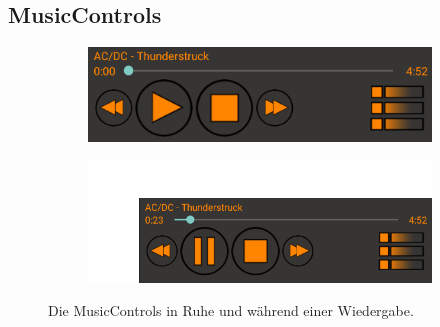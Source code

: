 \documentclass[FIPLY_base.tex]{subfiles}
\begin{document}
\newpage
\subsection {MusicControls}

\begin{figure}[h]
	\begin{subfigure}[b]{0.3\textwidth}
	\includegraphics[scale=0.55]{img/musicControls}
	\end{subfigure}
	\hfil
	\begin{subfigure}[b]{0.3\textwidth}
	\includegraphics[scale=0.55]{img/musicControlsPlaying}
	\end{subfigure}
	\caption{Die MusicControls in Ruhe und während einer Wiedergabe.}
\end{figure}
\end{document}

